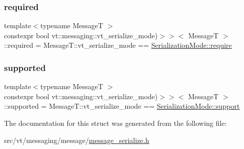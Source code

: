 \subsubsection{\texorpdfstring{required}{required}}
{\footnotesize\ttfamily template$<$typename MessageT $>$ \\
constexpr bool vt\+::messaging\+::vt\+\_\+serialize\+\_\+mode)$>$$>$$<$ MessageT $>$\+::required = Message\+T\+::vt\+\_\+serialize\+\_\+mode == \hyperlink{namespacevt_1_1messaging_a436c5b9fc7f591e5978a136999cb9ef8af0ffd3b7c2574ac324603ed00488c850}{Serialization\+Mode\+::require}\hspace{0.3cm}{\ttfamily [static]}}

\mbox{\label{structvt_1_1messaging_1_1msg__serialization__mode_3_01_message_t_00_01cxx14__void__t_3_01decltyp859af933e7cec0c00885df897a55208a_a98da648b67d20fb70bc0fa10c605f3ce}} 
\subsubsection{\texorpdfstring{supported}{supported}}
{\footnotesize\ttfamily template$<$typename MessageT $>$ \\
constexpr bool vt\+::messaging\+::vt\+\_\+serialize\+\_\+mode)$>$$>$$<$ MessageT $>$\+::supported = Message\+T\+::vt\+\_\+serialize\+\_\+mode == \hyperlink{namespacevt_1_1messaging_a436c5b9fc7f591e5978a136999cb9ef8a434990c8a25d2be94863561ae98bd682}{Serialization\+Mode\+::support}\hspace{0.3cm}{\ttfamily [static]}}



The documentation for this struct was generated from the following file\+:\begin{DoxyCompactItemize}
\item 
src/vt/messaging/message/\hyperlink{message__serialize_8h}{message\+\_\+serialize.\+h}\end{DoxyCompactItemize}
